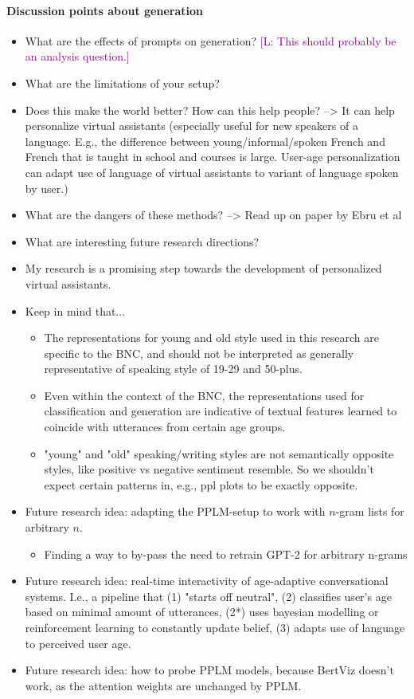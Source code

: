 \documentclass{report}
\newcommand{\len}[1]{\textcolor{purple}{[L: #1]}} %
\begin{document}
\paragraph{Discussion points about generation}
\begin{itemize}
    \item What are the effects of prompts on generation? \len{This should probably be an analysis question.}
    \item What are the limitations of your setup?
    \item Does this make the world better? How can this help people? --> It can help personalize virtual assistants (especially useful for new speakers of a language. E.g., the difference between young/informal/spoken French and French that is taught in school and courses is large. User-age personalization can adapt use of language of virtual assistants to variant of language spoken by user.)
    \item What are the dangers of these methods? --> Read up on paper by Ebru et al
    \item What are interesting future research directions?
    \item My research is a promising step towards the development of personalized virtual assistants.
    \item Keep in mind that...
        \begin{itemize}
            \item  The representations for young and old style used in this research are specific to the BNC, and should not be interpreted as generally representative of speaking style of 19-29 and 50-plus.
            \item Even within the context of the BNC, the representations used for classification and generation are indicative of textual features learned to coincide with utterances from certain age groups.
            \item "young" and "old" speaking/writing styles are not semantically opposite styles, like positive vs negative sentiment resemble. So we shouldn't expect certain patterns in, e.g., ppl plots to be exactly opposite.
        \end{itemize}
    \item Future research idea: adapting the PPLM-setup to work with $n$-gram lists for arbitrary $n$.
        \begin{itemize}
            \item Finding a way to by-pass the need to retrain GPT-2 for arbitrary n-grams
        \end{itemize}
    \item Future research idea: real-time interactivity of age-adaptive conversational systems. I.e., a pipeline that (1) "starts off neutral", (2) classifies user's age based on minimal amount of utterances, (2*) uses bayesian modelling or reinforcement learning to constantly update belief, (3) adapts use of language to perceived user age.
    \item Future research idea: how to probe PPLM models, because BertViz doesn't work, as the attention weights are unchanged by PPLM.
\end{itemize}
\end{document}
